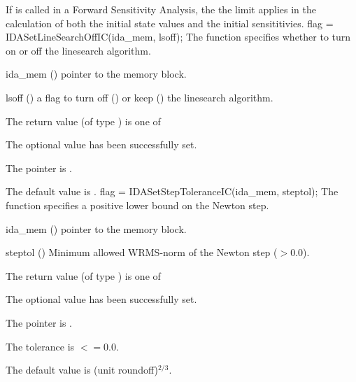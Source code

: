 {{  If  is called in a Forward Sensitivity Analysis, the
  the limit  applies in the calculation of both the initial state
  values and the initial sensititivies.
}
{
flag = IDASetLineSearchOffIC(ida\_mem, lsoff);
}
{
  The function  specifies whether to turn
  on or off the linesearch algorithm.
}
{
  \begin{args}
  \item[ida\_mem] ()
    pointer to the {\idas} memory block.
  \item[lsoff] ()
    a flag to turn off () or keep () the linesearch
    algorithm.
  \end{args}
}
{
  The return value  (of type ) is one of
  \begin{args}
  \item[\Id{IDA\_SUCCESS}]
    The optional value has been successfully set.
  \item[\Id{IDA\_MEM\_NULL}]
    The  pointer is .
  \end{args}
}
{
  The default value is .
}
{
flag = IDASetStepToleranceIC(ida\_mem, steptol);
}
{
  The function  specifies a positive lower bound
  on the Newton step.
}
{
  \begin{args}
  \item[ida\_mem] ()
    pointer to the {\idas} memory block.
  \item[steptol] ()
    Minimum allowed WRMS-norm of the Newton step ($> 0.0$).
  \end{args}
}
{
  The return value  (of type ) is one of
  \begin{args}
  \item[\Id{IDA\_SUCCESS}]
    The optional value has been successfully set.
  \item[\Id{IDA\_MEM\_NULL}]
    The  pointer is .
  \item[\Id{IDA\_ILL\_INPUT}]
    The  tolerance is  $<= 0.0$.
  \end{args}
}
{
  The default value is (unit roundoff)$^{2/3}$.
}



}
